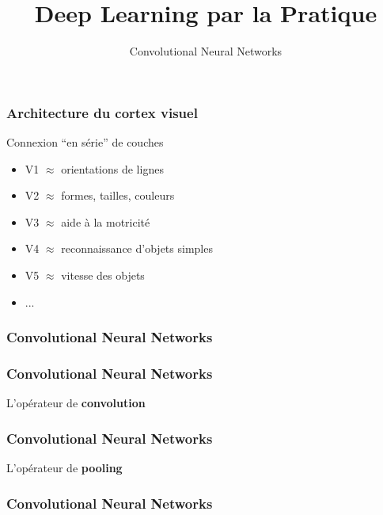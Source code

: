 \documentclass{formation}
\title{Deep Learning par la Pratique}
\subtitle{Convolutional Neural Networks}
\begin{document}
\maketitle

\begin{frame}
  \frametitle{Architecture du cortex visuel}
  \begin{minipage}[l]{0.55\linewidth}
  \end{minipage}\hfill
  \begin{minipage}[l]{0.44\linewidth}
    Connexion ``en série'' de couches
    \begin{itemize}
    \item V1 $\approx$ orientations de lignes
    \item V2 $\approx$ formes, tailles, couleurs
    \item V3 $\approx$ aide à la motricité
    \item V4 $\approx$ reconnaissance d'objets simples
    \item V5 $\approx$ vitesse des objets
    \item ...
    \end{itemize}
  \end{minipage}\hfill
\end{frame}

\begin{frame}
  \frametitle{Convolutional Neural Networks}
\end{frame}

\begin{frame}
  \frametitle{Convolutional Neural Networks}
  L'opérateur de \textbf{convolution}
\end{frame}

\begin{frame}
  \frametitle{Convolutional Neural Networks}
  L'opérateur de \textbf{pooling}
\end{frame}

\begin{frame}
  \frametitle{Convolutional Neural Networks}
\end{frame}
\end{document}
